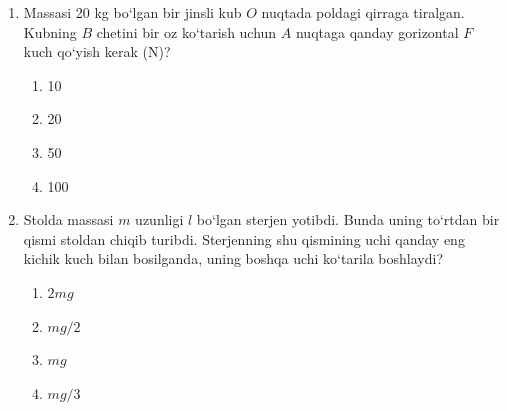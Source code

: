 \begin{enumerate}

\begin{enumerate}[label=\Alph*)]
\item $F_1 = F_2$
\item $F_1 = \sin\alpha \cdot F_2$
\item $F_2 = 2tg\alpha \cdot F_1$
\item $F_1 = 2ctg\alpha \cdot F_2$
\end{enumerate}

\item Massasi 20 kg bo‘lgan bir jinsli kub $O$ nuqtada poldagi qirraga tiralgan. Kubning $B$ chetini bir oz ko‘tarish uchun $A$ nuqtaga qanday gorizontal $F$ kuch qo‘yish kerak (N)?


\begin{enumerate}[label=\Alph*)]
\item 10
\item 20
\item 50
\item 100
\end{enumerate}

\item Stolda massasi $m$ uzunligi $l$ bo‘lgan sterjen yotibdi. Bunda uning to‘rtdan bir qismi stoldan chiqib turibdi. Sterjenning shu qismining uchi qanday eng kichik kuch bilan bosilganda, uning boshqa uchi ko‘tarila boshlaydi? 
\begin{enumerate}[label=\Alph*)]
\item $2mg$
\item $mg/2$
\item $mg$
\item $mg/3$
\end{enumerate}


\end{enumerate}
